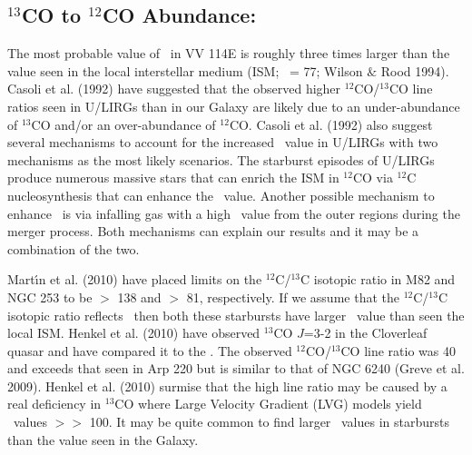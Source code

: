 \subsection{$^{13}$CO to $^{12}$CO Abundance: \xco}%
The most probable value of \xco\ in VV 114E is roughly three times larger than the value seen in the local interstellar medium (ISM; \xco\ = 77; Wilson $\&$ Rood 1994)\nocite{1994ARA&A..32..191W}. Casoli et al. (1992) have suggested that the observed higher $^{12}$CO/$^{13}$CO line ratios seen in U/LIRGs than in our Galaxy are likely due to an under-abundance of $^{13}$CO and/or an over-abundance of $^{12}$CO. Casoli et al. (1992)\nocite{1992A&A...264...55C} also suggest several mechanisms to account for the increased \xco\ value in U/LIRGs with two mechanisms as the most likely scenarios. The starburst episodes of U/LIRGs produce numerous massive stars that can enrich the ISM in $^{12}$CO via $^{12}$C nucleosynthesis that can enhance the \xco\ value. Another possible mechanism to enhance \xco\ is via infalling gas with a high \xco\ value from the outer regions during the merger process.  Both mechanisms can explain our results and it may be a combination of the two. 

Mart\'{\i}n  et al. (2010)\nocite{2010A&A...522A..62M} have placed limits on the $^{12}$C/$^{13}$C isotopic ratio in M82 and NGC 253 to be $>$ 138 and $>$ 81, respectively. If we assume that the  $^{12}$C/$^{13}$C isotopic ratio reflects  \xco\ then both these starbursts have larger \xco\ value than seen the local ISM. Henkel et al. (2010)\nocite{2010A&A...516A.111H} have observed $^{13}$CO $J$=3-2 in the Cloverleaf quasar and have compared it to the \cothree. The observed $^{12}$CO/$^{13}$CO line ratio was 40 and exceeds that seen in Arp 220 but is similar to that of NGC 6240 (Greve et al. 2009)\nocite{2009ApJ...692.1432G}. Henkel et al. (2010) surmise that the high line ratio may be caused by a real deficiency in $^{13}$CO where Large Velocity Gradient (LVG) models yield \xco\ values $>>$ 100. It may be quite common to find larger \xco\ values in starbursts than the value seen in the Galaxy. 

